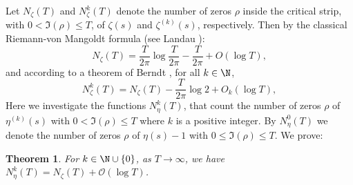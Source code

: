\documentclass{amsart}
\theoremstyle{plain}
\newtheorem{theorem}{Theorem}[section]
\theoremstyle{definition}
\newcommand{\zetak}{\zeta^{(k)}}
\begin{document}

Let $N_\zeta(T)$ and $N_\zeta^k(T)$ denote the number of zeros $\rho$ inside the critical strip, with 
$0 < \Im(\rho) \leq T$, of $\zeta(s)$ and $\zetak(s)$, respectively.
Then by the classical Riemann-von Mangoldt formula (see Landau \cite{landau}): 
\[
N_\zeta(T) = \frac{T}{2 \pi} \log \frac{T}{2 \pi} - \frac{T}{2 \pi} + O(\log T),
\]
and according to a theorem of Berndt \cite{berndt}, for all $k\in\N$, 
\begin{equation}\label{eqberndt}
N_\zeta^k(T) =N_\zeta(T) - \frac{T}{2 \pi} \log 2 + O_k(\log T),
\end{equation}
Here we investigate the functions $N_{\eta}^{k}(T)$, that count the number of zeros
$\rho$ of $\eta^{(k)}(s)$ with $0 < \Im(\rho) \leq T$ where \(k\) is a positive integer.
By $N_{\eta}^{0}(T)$ we denote the number of zeros $\rho$ of $\eta(s)-1$ with $0 \leq \Im(\rho) \leq T$.
We prove: 

\begin{theorem}\label{thm eta number}
    For $k\in\N\cup\{ 0\}$, as $T\to \infty$, we have
    \(N_{\eta}^{k}(T) = N_{\zeta}(T)+\mathcal{O}(\log T)\).
\end{theorem}
\end{document}
